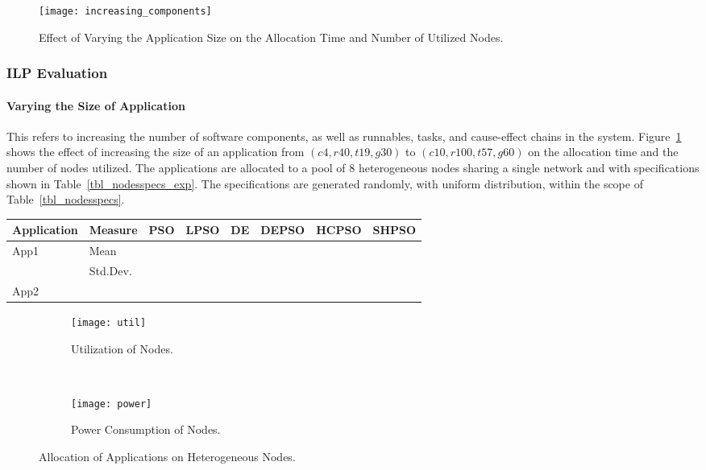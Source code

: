 \begin{figure}[t!]
\centering
\texttt{[image: increasing\_components]}
\caption{Effect of Varying the Application Size on the Allocation Time and Number of Utilized Nodes.}
\label{fig_increasing_components}
\end{figure}

\subsubsection{ILP Evaluation}
\paragraph{Varying the Size of Application} 
This refers to increasing the number of software components, as well as runnables, tasks, and cause-effect chains in the system. Figure~\ref{fig_increasing_components} shows the effect of increasing the size of an application from $(c4,r40,t19,g30)$ to $(c10,r100,t57,g60)$ on the allocation time and  the number of nodes utilized. The applications are allocated to a pool of 8 heterogeneous nodes sharing a single network and with specifications shown in Table~\ref{tbl_nodesspecs_exp}. The specifications are generated randomly, with uniform distribution, within the scope of Table~\ref{tbl_nodesspecs}.
\begin{table}[]
\small
\begin{tabular}{@{}llllllll@{}}
\toprule
Application & Measure & PSO & LPSO & DE & DEPSO & HCPSO & SHPSO \\ \midrule
App1 & Mean &  &  &  &  &  &  \\
 & Std.Dev. &  &  &  &  &  &  \\
App2 &  &  &  &  &  &  &  \\ \bottomrule
\end{tabular}
\end{table}

\begin{figure}
    \centering
    \begin{subfigure}[b]{0.4  \textwidth}
        \texttt{[image: util]}
        \caption{Utilization of Nodes.}
        \label{fig_util}
    \end{subfigure}
    ~%
        \begin{subfigure}[b]{0.4\textwidth}
        \texttt{[image: power]}
        \caption{Power Consumption of Nodes.}
        \label{fig_power}
    \end{subfigure}
    \caption{Allocation of Applications on Heterogeneous Nodes.}
    \label{fig_util_power}\vspace{-0.2cm}
\end{figure}

